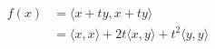 \documentclass[preview]{standalone}
\begin{document}
\begin{align*}
f(x) & = \langle x + ty,x + ty \rangle \\& = \langle x,x \rangle + 2t \langle x,y \rangle + t^{2} \langle y,y \rangle
\end{align*}
\end{document}
